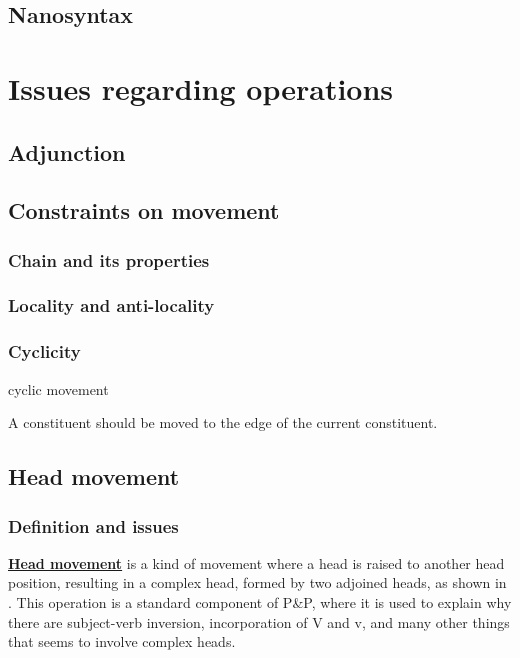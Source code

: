 \documentclass[a4paper]{article}
\newcommand*{\concept}[1]{\underline{\textbf{#1}}}
\begin{document}
\subsection{Nanosyntax}

\section{Issues regarding operations}\label{sec:issue-op}

\subsection{Adjunction}

\subsection{Constraints on movement}

\subsubsection{Chain and its properties}


\subsubsection{Locality and anti-locality}\label{sec:locality}

\subsubsection{Cyclicity}\label{sec:cyclic}

cyclic movement

A constituent should be moved to the edge of the current constituent.

\subsection{Head movement}


\subsubsection{Definition and issues}

\concept{Head movement} is a kind of movement where a head is raised to another head position, resulting in a complex head, formed by two adjoined heads, as shown in .
This operation is a standard component of P\&P, where it is used to explain why there are subject-verb inversion, incorporation of V and v, and many other things that seems to involve complex heads.
\end{document}
